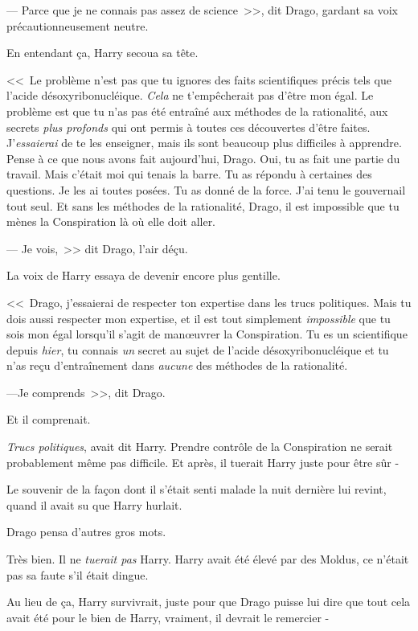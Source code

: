 --- Parce que je ne connais pas assez de science~>>, dit Drago, gardant sa voix précautionneusement neutre.

En entendant ça, Harry secoua sa tête.

<<~Le problème n'est pas que tu ignores des faits scientifiques précis tels que l'acide désoxyribonucléique. \emph{Cela} ne t'empêcherait pas d'être mon égal. Le problème est que tu n'as pas été entraîné aux méthodes de la rationalité, aux secrets \emph{plus profonds} qui ont permis à toutes ces découvertes d'être faites. J'\emph{essaierai} de te les enseigner, mais ils sont beaucoup plus difficiles à apprendre. Pense à ce que nous avons fait aujourd'hui, Drago. Oui, tu as fait une partie du travail. Mais c'était moi qui tenais la barre. Tu as répondu à certaines des questions. Je les ai toutes posées. Tu as donné de la force. J'ai tenu le gouvernail tout seul. Et sans les méthodes de la rationalité, Drago, il est impossible que tu mènes la Conspiration là où elle doit aller.

--- Je vois,~>> dit Drago, l'air déçu.

La voix de Harry essaya de devenir encore plus gentille.

<<~Drago, j'essaierai de respecter ton expertise dans les trucs politiques. Mais tu dois aussi respecter mon expertise, et il est tout simplement \emph{impossible} que tu sois mon égal lorsqu'il s'agit de manœuvrer la Conspiration. Tu es un scientifique depuis \emph{hier}, tu connais \emph{un} secret au sujet de l'acide désoxyribonucléique et tu n'as reçu d'entraînement dans \emph{aucune} des méthodes de la rationalité.

---Je comprends~>>, dit Drago.

Et il comprenait.

\emph{Trucs politiques}, avait dit Harry. Prendre contrôle de la Conspiration ne serait probablement même pas difficile. Et après, il tuerait Harry juste pour être sûr -

Le souvenir de la façon dont il s'était senti malade la nuit dernière lui revint, quand il avait su que Harry hurlait.

Drago pensa d'autres gros mots.

Très bien. Il ne \emph{tuerait pas} Harry. Harry avait été élevé par des Moldus, ce n'était pas sa faute s'il était dingue.

Au lieu de ça, Harry survivrait, juste pour que Drago puisse lui dire que tout cela avait été pour le bien de Harry, vraiment, il devrait le remercier -

